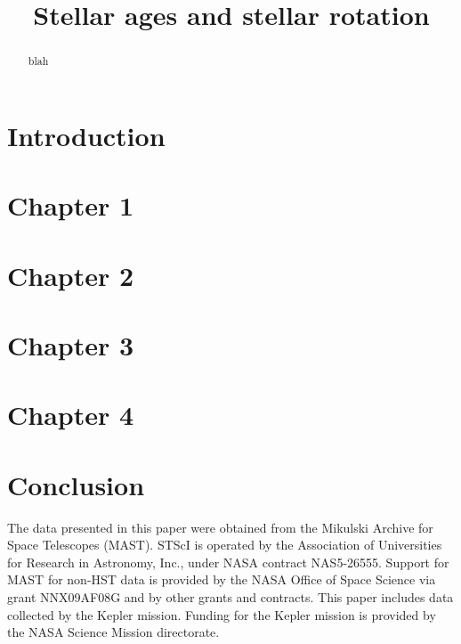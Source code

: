 \documentclass[useAMS, usenatbib, preprint, 12pt]{mitthesis}
\newcommand{\oxford}{1}
\begin{document}
\title{Stellar ages and stellar rotation}



\begin{abstract}

blah

\end{abstract}


\section*{Introduction}
\label{Introduction}



\section*{Chapter 1}
\label{sec:chapter1}



\section*{Chapter 2}
\label{sec:chapter2}

\section*{Chapter 3}
\label{sec:chapter3}

\section*{Chapter 4}
\label{sec:chapter4}



\section*{Conclusion}
\label{sec:conclusion}

The data presented in this paper were obtained from the Mikulski Archive for
Space Telescopes (MAST).
STScI is operated by the Association of Universities for Research in Astronomy,
Inc., under NASA contract NAS5-26555.
Support for MAST for non-HST data is provided by the NASA Office of Space
Science via grant NNX09AF08G and by other grants and contracts.
This paper includes data collected by the Kepler mission.
Funding for the Kepler mission is provided by the NASA Science Mission
directorate.
\end{document}
